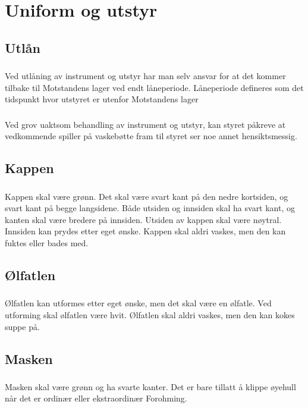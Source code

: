 \documentclass{article}
\newenvironment{statute}[1][]
    {
        \titleformat{\subsubsection}[runin]{\normalfont}{\hspace{1pt}\textit{\S\hspace{5pt}\thesubsubsection}}{0pt}{\rule{4pt}{0pt}}{}
        \subsubsection{}#1
        \begin{minipage}[t]{0.9\linewidth}
    }
    {
        \end{minipage}
        
        \ignorespacesafterend
    }
\begin{document}
    \section{Uniform og utstyr}
        \subsection{Utlån}
                \begin{statute}
                    Ved utlåning av instrument og utstyr har man selv ansvar for at det kommer tilbake til Motstandens lager ved endt låneperiode. Låneperiode defineres som det tidspunkt hvor utstyret er utenfor Motstandens lager
                \end{statute}
                \begin{statute}
                    Ved grov uaktsom behandling av instrument og utstyr, kan styret påkreve at vedkommende spiller på vaskebøtte fram til styret ser noe annet hensiktsmessig. 
                \end{statute}

            
        \subsection{Kappen}
                \begin{statute}
                    Kappen skal være grønn. Det skal være svart kant på den nedre kortsiden, og svart kant på begge langsidene. Både utsiden og innsiden skal ha svart kant, og kanten skal være bredere på innsiden. Utsiden av kappen skal være nøytral. Innsiden kan prydes etter eget ønske. Kappen skal aldri vaskes, men den kan fuktes eller bades med.
                \end{statute}

        \subsection{Ølfatlen}
            \begin{statute}
                Ølfatlen kan utformes etter eget ønske, men det skal være en ølfatle. Ved utforming skal ølfatlen være hvit. Ølfatlen skal aldri vaskes, men den kan kokes suppe på.
            \end{statute}
            
        \subsection{Masken}
            \begin{statute}
                Masken skal være grønn og ha svarte kanter. Det er bare tillatt å klippe øyehull når det er ordinær eller ekstraordinær Forohming.
            \end{statute}
           
\end{document}
